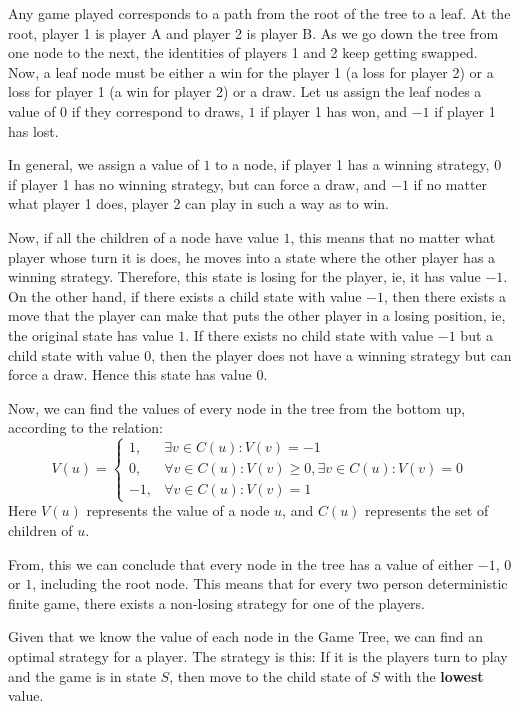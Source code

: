 \documentclass[12pt]{report}
\begin{document}
Any game played corresponds to a path from the root of the tree to a leaf. At the root, player 1 is player A and player 2 is player B. As we go down the tree from one node to the next, the identities of players 1 and 2 keep getting swapped.
Now, a leaf node must be either a win for the player 1 (a loss for player 2) or a loss for player 1 (a win for player 2) or a draw.
Let us assign the leaf nodes a value of $0$ if they correspond to draws, $1$ if player 1 has won, and $-1$ if player 1 has lost. 

In general, we assign a value of $1$ to a node, if player 1 has a winning strategy, $0$ if player 1 has no winning strategy, but can force a draw, and $-1$ if no matter what player 1 does, player 2 can play in such a way as to win.

Now, if all the children of a node have value $1$, this means that no matter what player whose turn it is does, he moves into a state where the other player has a winning strategy.
Therefore, this state is losing for the player, ie, it has value $-1$. On the other hand, if there exists a child state with value $-1$, then there exists a move that the player can make
that puts the other player in a losing position, ie, the original state has value $1$. If there exists no child state with value $-1$ but a child state with value $0$, then the player does not have 
a winning strategy but can force a draw. Hence this state has value $0$.

Now, we can find the values of every node in the tree from the bottom up, according to the relation:
\begin{equation}
    V(u) = \begin{cases}
        1, & \exists v \in C(u): V(v) = -1\\
        0, & \forall v \in C(u): V(v) \geq 0, \exists v \in C(u): V(v) = 0 \\
        -1, & \forall v \in C(u): V(v) = 1
    \end{cases}
\end{equation}
Here $V(u)$ represents the value of a node $u$, and $C(u)$ represents the set of children of $u$.

From, this we can conclude that every node in the tree has a value of either $-1$, $0$ or $1$, including the root node. This means that for 
every two person deterministic finite game, there exists a non-losing strategy for one of the players. 

Given that we know the value of each node in the Game Tree, we can find an optimal strategy for a player.
The strategy is this: If it is the players turn to play and the game is in state $S$, then move to the child state of $S$ with the \textbf{lowest} value.
\end{document}
